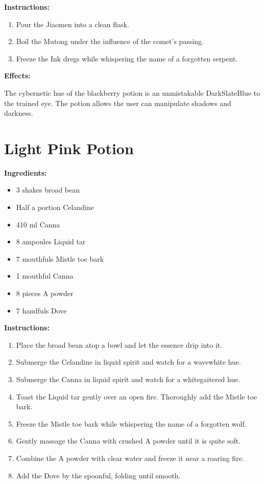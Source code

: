 \documentclass{article}
\begin{document}
\textbf{Instructions:}

\begin{enumerate}
  \item Pour the Jiaomen into a clean flask.
  \item Boil the Mutong under the influence of the comet’s passing.
  \item Freeze the Ink dregs while whispering the name of a forgotten serpent.
\end{enumerate}

\textbf{Effects:}

The cybernetic hue of the blackberry potion is an unmistakable DarkSlateBlue to the trained eye. The potion allows the user can manipulate shadows and darkness.

\newpage
\section*{Light Pink Potion}

\textbf{Ingredients:}

\begin{itemize}
  \item 3 shakes broad bean
  \item Half a portion Celandine
  \item 410 ml Canna
  \item 8 ampoules Liquid tar
  \item 7 mouthfuls Mistle toe bark
  \item 1 mouthful Canna
  \item 8 pieces A powder
  \item 7 handfuls Dove
\end{itemize}

\textbf{Instructions:}

\begin{enumerate}
  \item Place the broad bean atop a bowl and let the essence drip into it.
  \item Submerge the Celandine in liquid spirit and watch for a wavewhite hue.
  \item Submerge the Canna in liquid spirit and watch for a whitegaitered hue.
  \item Toast the Liquid tar gently over an open fire. Thoroughly add the Mistle toe bark.
  \item Freeze the Mistle toe bark while whispering the name of a forgotten wolf.
  \item Gently massage the Canna with crushed A powder until it is quite soft.
  \item Combine the A powder with clear water and freeze it near a roaring fire.
  \item Add the Dove by the spoonful, folding until smooth.
\end{enumerate}
\end{document}
